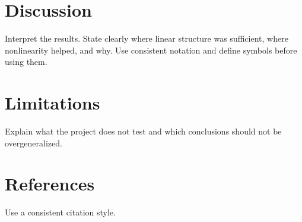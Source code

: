 \documentclass[11pt]{article}
\begin{document}
\section{Discussion}
Interpret the results. State clearly where linear structure was sufficient, where nonlinearity helped, and why. Use consistent notation and define symbols before using them.

\section{Limitations}
Explain what the project does not test and which conclusions should not be overgeneralized.

\section*{References}
Use a consistent citation style.
\end{document}
